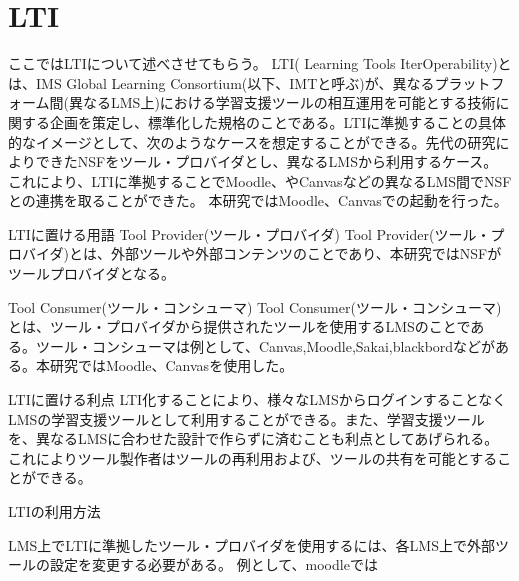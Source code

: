 \section{LTI}
\label{tag:LTI}


ここではLTIについて述べさせてもらう。
LTI(
Learning Tools IterOperability)とは、IMS Global Learning Consortium(以下、IMTと呼ぶ)が、異なるプラットフォーム間(異なるLMS上)における学習支援ツールの相互運用を可能とする技術に関する企画を策定し、標準化した規格のことである。LTIに準拠することの具体的なイメージとして、次のようなケースを想定することができる。先代の研究によりできたNSFをツール・プロバイダとし、異なるLMSから利用するケース。
これにより、LTIに準拠することでMoodle、やCanvasなどの異なるLMS間でNSFとの連携を取ることができた。
本研究ではMoodle、Canvasでの起動を行った。

LTIに置ける用語
Tool Provider(ツール・プロバイダ)
Tool Provider(ツール・プロバイダ)とは、外部ツールや外部コンテンツのことであり、本研究ではNSFがツールプロバイダとなる。

Tool Consumer(ツール・コンシューマ)
Tool Consumer(ツール・コンシューマ)とは、ツール・プロバイダから提供されたツールを使用するLMSのことである。ツール・コンシューマは例として、Canvas,Moodle,Sakai,blackbordなどがある。本研究ではMoodle、Canvasを使用した。

LTIに置ける利点
LTI化することにより、様々なLMSからログインすることなくLMSの学習支援ツールとして利用することができる。また、学習支援ツールを、異なるLMSに合わせた設計で作らずに済むことも利点としてあげられる。これによりツール製作者はツールの再利用および、ツールの共有を可能とすることができる。

LTIの利用方法

LMS上でLTIに準拠したツール・プロバイダを使用するには、各LMS上で外部ツールの設定を変更する必要がある。
例として、moodleでは
